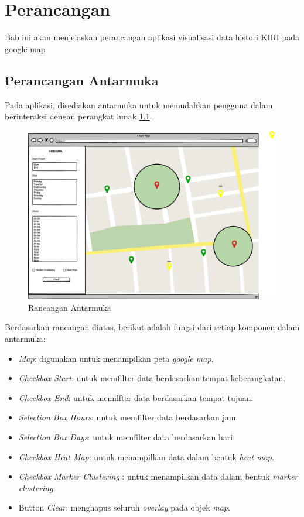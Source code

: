 \chapter{Perancangan}
\label{chap:perancangan}
Bab ini akan menjelaskan perancangan aplikasi visualisasi data histori KIRI pada google map

\section{Perancangan Antarmuka}
\label{sec:perancanganAntarmuka}
Pada aplikasi, disediakan antarmuka untuk memudahkan pengguna dalam berinteraksi dengan perangkat lunak \ref{fig:antarmuka}.

\begin{figure}[H]
	\centering  
	\includegraphics[scale=0.3]{Gambar/mockup.PNG}  
	\caption[Rancangan Antarmuka]{Rancangan Antarmuka} 
	\label{fig:antarmuka} 
\end{figure}

Berdasarkan rancangan diatas, berikut adalah fungsi dari setiap komponen dalam antarmuka:
\begin{itemize}
	\item \textit{Map}: digunakan untuk menampilkan peta \textit{google map}.
	\item \textit{Checkbox Start}: untuk memfilter data berdasarkan tempat keberangkatan.
	\item \textit{Checkbox End}: untuk memilfter data berdasarkan tempat tujuan.
	\item \textit{Selection Box Hours}: untuk memfilter data berdasarkan jam.
	\item \textit{Selection Box Days}: untuk memfilter data berdasarkan hari.
	\item \textit{Checkbox Heat Map}: untuk menampilkan data dalam bentuk \textit{heat map}.
	\item \textit{Checkbox Marker Clustering} : untuk menampilkan data dalam bentuk \textit{marker clustering}.
	\item Button \textit{Clear}: menghapus seluruh \textit{overlay} pada objek \textit{map}.
\end{itemize}

